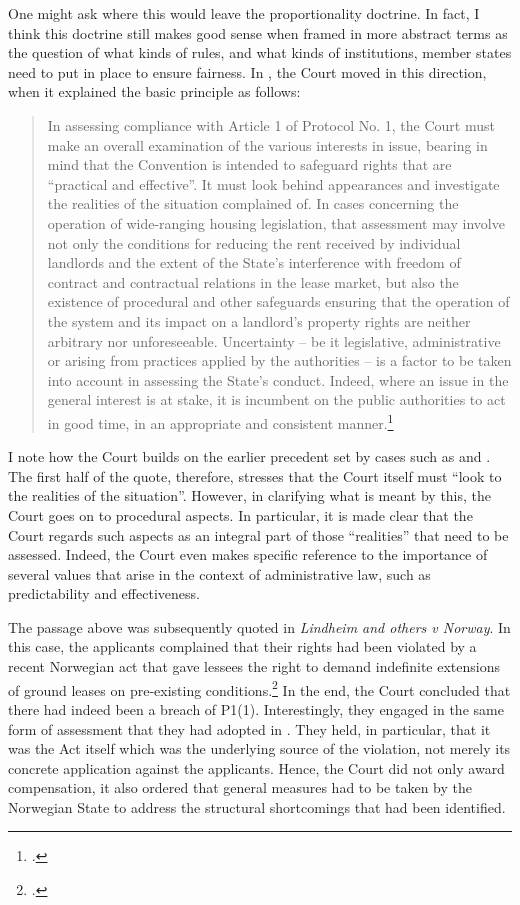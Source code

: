 One might ask where this would leave the proportionality doctrine. In fact, I think this doctrine still makes good sense when framed in more abstract terms as the question of what kinds of rules, and what kinds of institutions, member states need to put in place to ensure fairness. In \textcite{hutten06}, the Court moved in this direction, when it explained the basic principle as follows:

\begin{quote}
In assessing compliance with Article 1 of Protocol No. 1, the Court must make an overall examination of the various interests in issue, bearing in mind that the Convention is intended to safeguard rights that are “practical and effective”. It must look behind appearances and investigate the realities of the situation complained of. In cases concerning the operation of wide-ranging housing legislation, that assessment may involve not only the conditions for reducing the rent received by individual landlords and the extent of the State’s interference with freedom of contract and contractual relations in the lease market, but also the existence of procedural and other safeguards ensuring that the operation of the system and its impact on a landlord’s property rights are neither arbitrary nor unforeseeable. Uncertainty – be it legislative, administrative or arising from practices applied by the authorities – is a factor to be taken into account in assessing the State’s conduct. Indeed, where an issue in the general interest is at stake, it is incumbent on the public authorities to act in good time, in an appropriate and consistent manner.\footcite[151]{hutten06} 
\end{quote}

I note how the Court builds on the earlier precedent set by cases such as \textcite{sporrong82} and \textcite{james86}. The first half of the quote, therefore, stresses that the Court itself must ``look to the realities of the situation''. However, in clarifying what is meant by this, the Court goes on to  procedural aspects. In particular, it is made clear that the Court regards such aspects as an integral part of those ``realities'' that need to be assessed. Indeed, the Court even makes specific reference to the importance of several values that arise in the context of administrative law, such as predictability and effectiveness.

The passage above was subsequently quoted in {\it Lindheim and others v Norway}. In this case, the applicants complained that their rights had been violated by a recent Norwegian act that gave lessees the right to demand indefinite extensions of ground leases on pre-existing conditions.\footcite[119]{lindheim12}  In the end, the Court concluded that there had indeed been a breach of P1(1). Interestingly, they engaged in the same form of assessment that they had adopted in \textcite{hutten06}. They held, in particular, that it was the Act itself which was the underlying source of the violation, not merely its concrete application against the applicants. Hence, the Court did not only award compensation, it also ordered that general measures had to be taken by the Norwegian State to address the structural shortcomings that had been identified.

